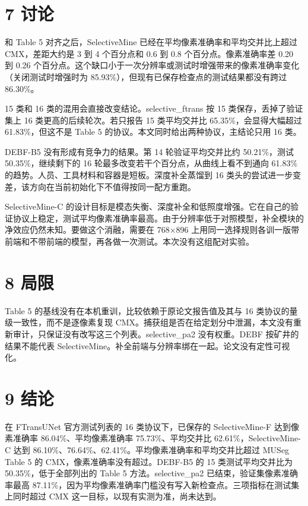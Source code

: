 \documentclass[11pt]{article}
\begin{document}
\section*{7 讨论}
和 Table 5 对齐之后，SelectiveMine 已经在平均像素准确率和平均交并比上超过 CMX，差距大约是 3 到 4 个百分点和 0.6 到 0.8 个百分点。像素准确率差 0.20 到 0.26 个百分点。这个缺口小于一次分辨率或测试时增强带来的像素准确率变化（关闭测试时增强时为 85.93\%），但现有已保存检查点的测试结果都没有跨过 86.30\%。

15 类和 16 类的混用会直接改变结论。selective\_\allowbreak ftrans 按 15 类保存，丢掉了验证集上 16 类更高的后续轮次。若只报告 15 类平均交并比 65.35\%，会显得大幅超过 61.83\%，但这不是 Table 5 的协议。本文同时给出两种协议，主结论只用 16 类。

DEBF-B5 没有形成有竞争力的结果。第 14 轮验证平均交并比约 50.21\%，测试 50.35\%，继续剩下的 16 轮最多改变若干个百分点，从曲线上看不到通向 61.83\% 的趋势。人员、工具材料和容器是短板。深度补全蒸馏到 16 类头的尝试进一步变差，该方向在当前初始化下不值得按同一配方重跑。

SelectiveMine-C 的设计目标是模态失衡、深度补全和低照度增强。它在自己的验证协议上稳定，测试平均像素准确率最高。由于分辨率低于对照模型，补全模块的净效应仍然未知。要做这个消融，需要在 768×896 上用同一选择规则各训一版带前端和不带前端的模型，再各做一次测试。本次没有这组配对实验。

\section*{8 局限}
Table 5 的基线没有在本机重训，比较依赖于原论文报告值及其与 16 类协议的量级一致性，而不是逐像素复现 CMX。捕获组是否在给定划分中泄漏，本文没有重新审计，只保证没有改写这三个列表。selective\_\allowbreak pa2 没有权重。DEBF 按矿井的结果不能代表 SelectiveMine。补全前端与分辨率绑在一起。论文没有定性可视化。

\section*{9 结论}
在 FTransUNet 官方测试列表的 16 类协议下，已保存的 SelectiveMine-F 达到像素准确率 86.04\%、平均像素准确率 75.73\%、平均交并比 62.61\%，SelectiveMine-C 达到 86.10\%、76.64\%、62.41\%。平均像素准确率和平均交并比超过 MUSeg Table 5 的 CMX，像素准确率没有超过。DEBF-B5 的 15 类测试平均交并比为 50.35\%，低于全部列出的 Table 5 方法。selective\_\allowbreak pa2 已结束，验证集像素准确率最高 87.11\%，因为平均像素准确率门槛没有写入新检查点。三项指标在测试集上同时超过 CMX 这一目标，以现有实测为准，尚未达到。
\end{document}
